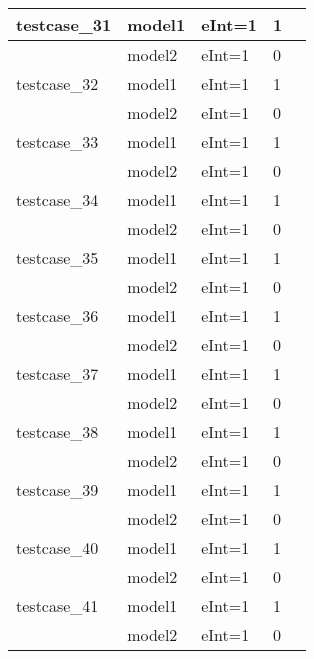 \documentclass[a4paper]{article}
\begin{document}
\begin{longtable}{|l|l|l|l|l|}
\hline
testcase\_31 & model1 & eInt=1 & 1 &\\
\hline
 & model2 & eInt=1 & 0 &\\
\hline
testcase\_32 & model1 & eInt=1 & 1 &\\
\hline
 & model2 & eInt=1 & 0 &\\
\hline
testcase\_33 & model1 & eInt=1 & 1 &\\
\hline
 & model2 & eInt=1 & 0 &\\
\hline
testcase\_34 & model1 & eInt=1 & 1 &\\
\hline
 & model2 & eInt=1 & 0 &\\
\hline
testcase\_35 & model1 & eInt=1 & 1 &\\
\hline
 & model2 & eInt=1 & 0 &\\
\hline
testcase\_36 & model1 & eInt=1 & 1 &\\
\hline
 & model2 & eInt=1 & 0 &\\
\hline
testcase\_37 & model1 & eInt=1 & 1 \\
\hline
 & model2 & eInt=1 & 0 &\\
\hline
testcase\_38 & model1 & eInt=1 & 1 &\\
\hline
 & model2 & eInt=1 & 0 &\\
\hline
testcase\_39 & model1 & eInt=1 & 1 &\\
\hline
 & model2 & eInt=1 & 0 &\\
\hline
testcase\_40 & model1 & eInt=1 & 1 &\\
\hline
 & model2 & eInt=1 & 0 &\\
\hline
testcase\_41 & model1 & eInt=1 & 1 &\\
\hline
 & model2 & eInt=1 & 0 &\\
\hline

\end{longtable}
\end{document}
